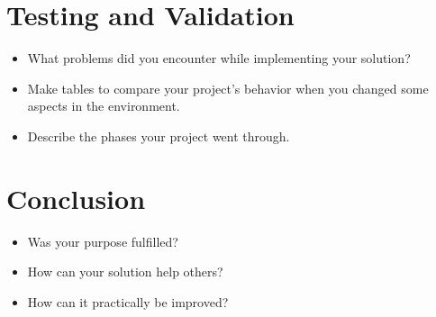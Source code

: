 \documentclass[12pt]{article}
\begin{document}
	\clearpage
	
	\section{Testing and Validation}
	\begin{itemize}
		\item What problems did you encounter while implementing your solution?
		\item Make tables to compare your project's behavior when you changed some aspects in the environment.
		\item Describe the phases your project went through.
	\end{itemize}
	
	\section{Conclusion}
	\begin{itemize}
		\item Was your purpose fulfilled? 
		\item How can your solution help others? 
		\item How can it practically be improved?
	\end{itemize}
	
	 
	
	
\end{document}
